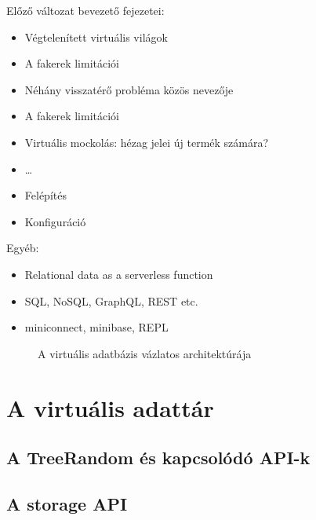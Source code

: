 \documentclass[
    parspace, %
    noindent, %
]{elteiktdk}[2023/04/10]
\begin{document}

Előző változat bevezető fejezetei:

\begin{itemize}
    \item Végtelenített virtuális világok
    \item A fakerek limitációi
    \item Néhány visszatérő probléma közös nevezője
    \item A fakerek limitációi
    \item Virtuális mockolás: hézag jelei új termék számára?
    \item \dots
    \item Felépítés
    \item Konfiguráció
\end{itemize}

Egyéb:

\begin{itemize}
    \item Relational data as a serverless function
    \item SQL, NoSQL, GraphQL, REST etc.
    \item miniconnect, minibase, REPL
\end{itemize}

\begin{figure}[H]
\centering

\caption{A virtuális adatbázis vázlatos architektúrája}
\label{A virtuális adatbázis vázlatos architektúrája}
\end{figure}















\chapter{A virtuális adattár}

\section{A TreeRandom és kapcsolódó API-k}


\section{A storage API}
\end{document}
